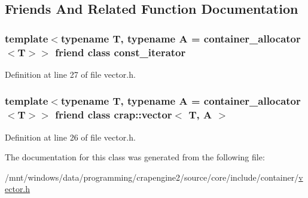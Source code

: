 \subsection{Friends And Related Function Documentation}
\hypertarget{classcrap_1_1vector_1_1iterator_ac220ce1c155db1ac44146c12d178056f}{
\subsubsection[{const\+\_\+iterator}]{\setlength{\rightskip}{0pt plus 5cm}template$<$typename T, typename A = container\+\_\+allocator$<$\+T$>$$>$ friend class {\bf const\+\_\+iterator}\hspace{0.3cm}{\ttfamily [friend]}}}\label{classcrap_1_1vector_1_1iterator_ac220ce1c155db1ac44146c12d178056f}


Definition at line 27 of file vector.\+h.

\hypertarget{classcrap_1_1vector_1_1iterator_ad6b7070de08891c8bdaba9bce10c2220}{
\subsubsection[{crap\+::vector$<$ T, A $>$}]{\setlength{\rightskip}{0pt plus 5cm}template$<$typename T, typename A = container\+\_\+allocator$<$\+T$>$$>$ friend class {\bf crap\+::vector}$<$ T, A $>$\hspace{0.3cm}{\ttfamily [friend]}}}\label{classcrap_1_1vector_1_1iterator_ad6b7070de08891c8bdaba9bce10c2220}


Definition at line 26 of file vector.\+h.



The documentation for this class was generated from the following file\+:\begin{DoxyCompactItemize}
\item 
/mnt/windows/data/programming/crapengine2/source/core/include/container/\hyperlink{vector_8h}{vector.\+h}\end{DoxyCompactItemize}
